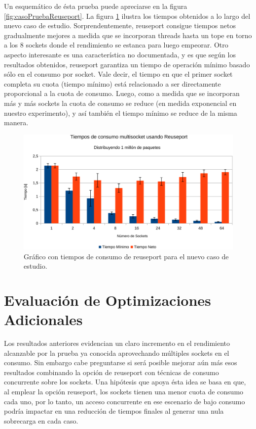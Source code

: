 Un esquemático de ésta prueba puede apreciarse en la figura \ref{fig:casoPruebaReuseport}. La figura \ref{fig:resultadosReuseport} ilustra los tiempos obtenidos a lo largo del nuevo caso de estudio. Sorprendentemente, reuseport consigue tiempos netos gradualmente mejores a medida que se incorporan threads hasta un tope en torno a los 8 sockets donde el rendimiento se estanca para luego empeorar. Otro aspecto interesante es una característica no documentada, y es que según los resultados obtenidos, reuseport garantiza un tiempo de operación mínimo basado sólo en el consumo por socket. Vale decir, el tiempo en que el primer socket completa su cuota (tiempo mínimo) está relacionado a ser directamente proporcional a la cuota de consumo. Luego, como a medida que se incorporan más y más sockets la cuota de consumo se reduce (en medida exponencial en nuestro experimento), y así también el tiempo mínimo se reduce de la misma manera.

\begin{figure}[!h]
	\centering
	\includegraphics[scale=.6]{resultados/reuseport1-crop.pdf}
	\caption{Gráfico con tiempos de consumo de reuseport para el nuevo caso de estudio.}
	\label{fig:resultadosReuseport}
\end{figure}

\section{Evaluación de Optimizaciones Adicionales}
Los resultados anteriores evidencian un claro incremento en el rendimiento alcanzable por la prueba ya conocida aprovechando múltiples sockets en el consumo. Sin embargo cabe preguntarse si será posible mejorar aún más esos resultados combinando la opción de reuseport con técnicas de consumo concurrente sobre los sockets. Una hipótesis que apoya ésta idea se basa en que, al emplear la opción reuseport, los sockets tienen una menor cuota de consumo cada uno, por lo tanto, un acceso concurrente en ese escenario de bajo consumo podría impactar en una reducción de tiempos finales al generar una nula sobrecarga en cada caso.

